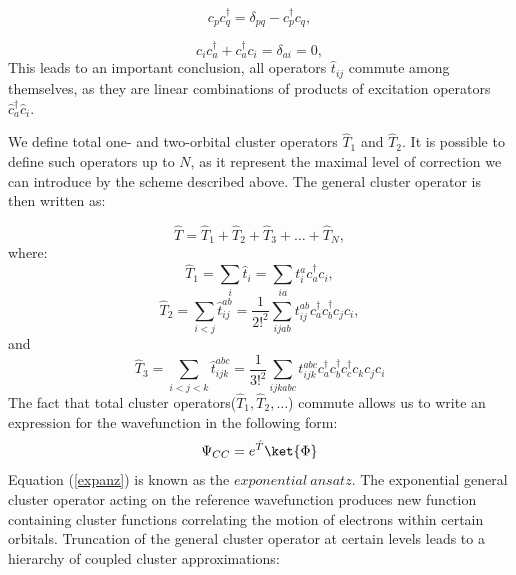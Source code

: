 \documentclass[twoside,english]{uiofysmaster}
\begin{document}
\[
c_p c_q^\dag = \delta_{pq} - c_p^\dag c_q,
\]

\[
c_ic_a^\dag + c_a^\dag c_i = \delta_{ai} = 0,
\]
This leads to an important conclusion, all operators $\hat{t}_{ij}$ commute among themselves, as they are linear combinations of products of excitation operators $\hat{c}_a^\dagger \hat{c}_i$.


We define total one- and two-orbital cluster operators $\hat{T}_1$ and $\hat{T}_2$. It is possible to define such operators up to $N$, as it represent the maximal level of correction we can introduce by the scheme described above. The general cluster operator is then written as:

\[
\hat{T} = \hat{T}_1 + \hat{T}_2 +\hat{T}_3 + \dots + \hat{T}_N,
\]
where:
\[ 
\hat{T}_1 = \sum_{i}\hat{t}_i = \sum_{ia}t_{i}^{a} c^\dag_{a}  c_{i},
\] 
\[ 
\hat{T}_2 = \sum_{i<j}\hat{t}_{ij}^{ab} = \frac{1}{2!^2}\sum_{ijab}t_{ij}^{ab} c^\dag_{a} c^\dag_{b} c_{j} c_{i}, 
\]
and
\[ 
\hat{T}_3 = \sum_{i<j<k}\hat{t}_{ijk}^{abc} = \frac{1}{3!^2}\sum_{ijkabc}t_{ijk}^{abc} c^\dag_{a} c^\dag_{b} c^\dag_{c} c_{k}c_{j} c_{i} 
\]
The fact that total cluster operators($\hat{T}_1, \hat{T}_2, \dots$) commute allows us to write an expression for the wavefunction in the following form:
\begin{equation}\label{expanz}
	\Psi_{CC} =  e^{\hat{T}}\ket{\Phi}
\end{equation}
Equation (\ref{expanz}) is known as the $exponential\ ansatz$. The exponential general cluster operator acting on the reference wavefunction produces new function containing cluster functions correlating the motion of electrons within certain orbitals.
Truncation of the general cluster operator at certain levels leads to a hierarchy of coupled cluster approximations:
\end{document}

